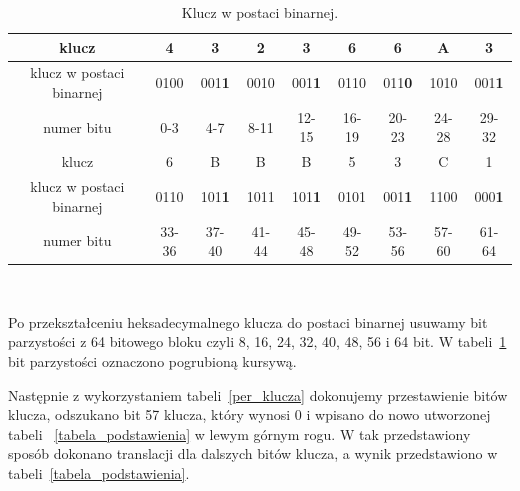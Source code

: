 \documentclass[12p]{article}
\begin{document}
\begin{table}[!h]
\centering
\begin{tabular}{|c|c|c|c|c|c|c|c|c|}
\hline
klucz & 4 & 3 & 2 & 3 & 6 & 6 & A & 3\\
\hline
klucz w postaci binarnej & 0100 & 001\textbf{1} & 0010 & 001\textbf{1} & 0110 & 011\textbf{0} & 1010 & 001\textbf{1}\\ 
\hline
numer bitu & 0-3 & 4-7 & 8-11 & 12-15 & 16-19 & 20-23 & 24-28 & 29-32\\
\hline
\hline
klucz & 6 & B & B & B & 5 & 3 & C & 1\\
\hline
klucz w postaci binarnej & 0110 & 101\textbf{1} & 1011 & 101\textbf{1} & 0101 & 001\textbf{1} & 1100 & 000\textbf{1}\\
\hline
numer bitu & 33-36 & 37-40 & 41-44 & 45-48 & 49-52 & 53-56 & 57-60 & 61-64\\
\hline
\end{tabular}
\caption{Klucz w postaci binarnej.}~\label{klucz_to_binary}
\end{table}

Po przekształceniu heksadecymalnego klucza do postaci binarnej usuwamy bit parzystości z 64 bitowego bloku czyli 8, 16, 24, 32, 40, 48, 56 i 64 bit. W tabeli~\ref{klucz_to_binary} bit parzystości oznaczono pogrubioną kursywą.

Następnie z wykorzystaniem tabeli~\ref{per_klucza} dokonujemy przestawienie bitów klucza, odszukano bit 57 klucza, który wynosi 0 i wpisano do nowo utworzonej tabeli ~\ref{tabela_podstawienia} w lewym górnym rogu. W tak przedstawiony sposób dokonano translacji dla dalszych bitów klucza, a wynik przedstawiono w tabeli~\ref{tabela_podstawienia}.
\end{document}
